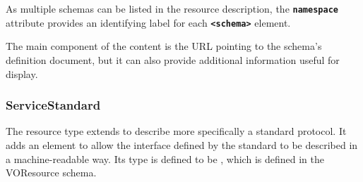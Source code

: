 \documentclass[11pt,a4paper]{ivoa}
\begin{document}

As multiple schemas can be listed in the resource description, the
\textbf{\texttt{namespace}} attribute provides an
identifying label for each \textbf{\texttt{<schema>}}
element.


The main component of the 
content is the URL pointing to the schema's definition document, but
it can also provide additional information useful for display.


\subsubsection{ServiceStandard}

The  resource type extends
 to describe more
specifically a standard protocol.  It adds an
 element to allow the interface defined
by the standard to be described in a machine-readable way.  Its type
is defined to be , which is defined in the
VOResource schema.
\end{document}
